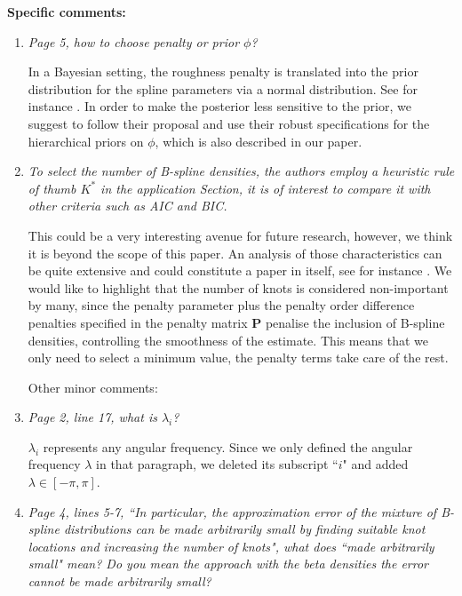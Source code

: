 \documentclass{scrartcl}
\newcommand{\refereeQuote}{\textit }
\newcommand{\response}{}
\begin{document}
\textbf{Specific comments:}
\begin{enumerate}
	\item \refereeQuote{ Page 5, how to choose penalty or prior $\phi$?}
	
	\response{In a Bayesian setting, the roughness penalty is translated into the prior distribution for the spline parameters via a normal distribution.  See for instance \cite{Bremhorst:2016}.  In order to make the posterior less sensitive to the prior, we suggest to follow their proposal and use their robust specifications for the hierarchical priors on $\phi$, which is also described in our paper. }
	
	\item \refereeQuote{To select the number of B-spline densities, the authors employ a heuristic rule of thumb $K^*$ in the application Section, it is of interest to compare it with other criteria such as AIC and BIC.}\smallskip
	
	\response{This could be a very interesting avenue for future research, however, we think it is beyond the scope of this paper.  An analysis of those characteristics can be quite extensive and could constitute a paper in itself, see for instance \cite{Likhachev2017}.  We would like to highlight that the number of knots is considered non-important by many, since the penalty parameter plus the penalty order difference penalties specified in the penalty matrix $\textbf{P}$ penalise the inclusion of B-spline densities, controlling the smoothness of the estimate.  This means that we only need to select a minimum value, the penalty terms take care of the rest.}\bigskip
	
	Other minor comments: \bigskip
	
	\item \refereeQuote{Page 2, line 17, what is $\lambda_i$?}\smallskip
	
	\response{$\lambda_i$ represents any angular frequency. Since we only defined the angular frequency $\lambda$ in that paragraph, we deleted its subscript ``$i$" and added $\lambda\in[-\pi,\pi]$. } \bigskip
	
	\item \refereeQuote{ Page 4, lines 5-7, ``In particular, the approximation error of the mixture of B-spline distributions can be made arbitrarily small by finding suitable knot locations and increasing the number of knots", what does ``made arbitrarily small" mean? Do you mean the approach with the beta densities the error cannot be made arbitrarily small?}\smallskip
	

\end{enumerate}
\end{document}
